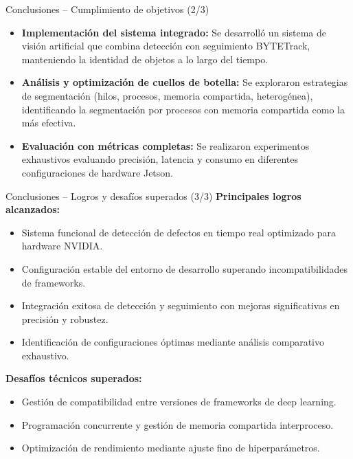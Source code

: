 \documentclass[spanish]{beamer}
\begin{document}
\begin{frame}{Conclusiones -- Cumplimiento de objetivos (2/3)}
    \begin{itemize}
        \item \textbf{Implementación del sistema integrado:} Se desarrolló un sistema de visión artificial que combina detección con seguimiento BYTETrack, manteniendo la identidad de objetos a lo largo del tiempo.
        \item \textbf{Análisis y optimización de cuellos de botella:} Se exploraron estrategias de segmentación (hilos, procesos, memoria compartida, heterogénea), identificando la segmentación por procesos con memoria compartida como la más efectiva.
        \item \textbf{Evaluación con métricas completas:} Se realizaron experimentos exhaustivos evaluando precisión, latencia y consumo en diferentes configuraciones de hardware Jetson.
    \end{itemize}
\end{frame}

\begin{frame}{Conclusiones -- Logros y desafíos superados (3/3)}
    \textbf{Principales logros alcanzados:}
    \begin{itemize}
        \item Sistema funcional de detección de defectos en tiempo real optimizado para hardware NVIDIA\@.
        \item Configuración estable del entorno de desarrollo superando incompatibilidades de frameworks.
        \item Integración exitosa de detección y seguimiento con mejoras significativas en precisión y robustez.
        \item Identificación de configuraciones óptimas mediante análisis comparativo exhaustivo.
    \end{itemize}
    
    \vspace{0.5cm}
    
    \textbf{Desafíos técnicos superados:}
    \begin{itemize}
        \item Gestión de compatibilidad entre versiones de frameworks de deep learning.
        \item Programación concurrente y gestión de memoria compartida interproceso.
        \item Optimización de rendimiento mediante ajuste fino de hiperparámetros.
    \end{itemize}
\end{frame}

\begin{frame}
    \titlepage
\end{frame}
\end{document}

